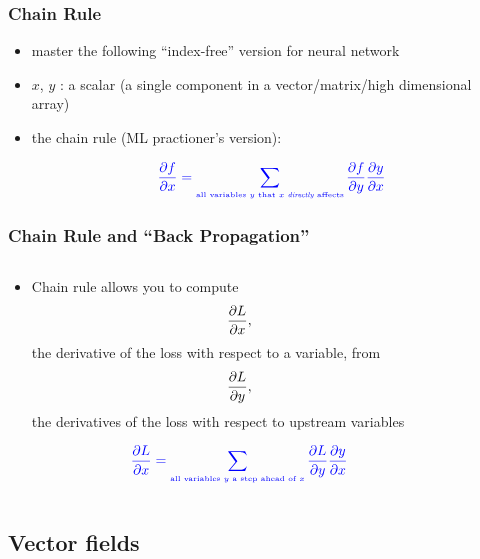 \documentclass[12pt,dvipdfmx]{beamer}
\newcommand{\ao}[1]{{\color{blue}#1}}
\begin{document}
\begin{frame}
\frametitle{Chain Rule}
\begin{itemize}
\item master the following ``index-free'' version for neural network
  
\item $x$, $y$ : a scalar
  (a single component in a vector/matrix/high dimensional array)

\item \ao{the chain rule (ML practioner's version):}
  
  \[ \ao{\pp{f}{x} = \sum_{\mbox{{\tiny all variables $y$ that $x$ {\it directly} affects}}}
    \pp{f}{y} \pp{y}{x}}
  \]

\begin{center}
\def\svgwidth{0.25\textwidth}
{\scriptsize}
\end{center}

\end{itemize}
\end{frame}


\begin{frame}
  \frametitle{Chain Rule and ``Back Propagation''}
  \begin{columns}
    \begin{column}{0.6\textwidth}
{\footnotesize      
\begin{itemize}
\item Chain rule allows you to compute
  \[ \frac{\partial L}{\partial x}, \]
  the derivative of the loss with respect to a variable,
  from
  \[ \frac{\partial L}{\partial y}, \]
  the derivatives of the loss with respect to upstream variables

  \[ \ao{\pp{L}{x}
      = \sum_{\mbox{{\tiny all variables $y$ a step ahead of $x$}}}
      \pp{L}{y} \pp{y}{x}}
  \]
\end{itemize}}
\end{column}
\begin{column}{0.4\textwidth}
\begin{center}
\def\svgwidth{0.45\textwidth}
{\tiny}
\end{center}
\end{column}
\end{columns}
  

\end{frame}

\iffalse
\subsection{Vector fields}
\end{document}
